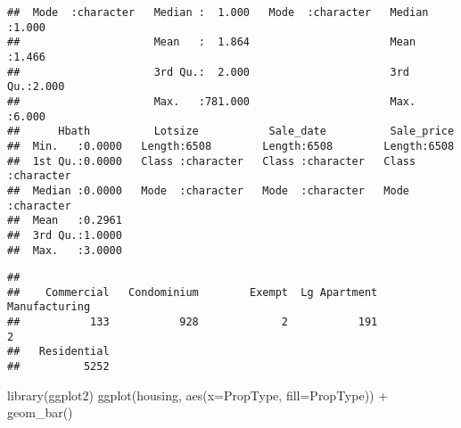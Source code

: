 \documentclass[
]{article}
\newenvironment{Shaded}{\begin{snugshade}}{\end{snugshade}}
\newcommand{\AttributeTok}[1]{\textcolor[rgb]{0.77,0.63,0.00}{#1}}
\newcommand{\CommentTok}[1]{\textcolor[rgb]{0.56,0.35,0.01}{\textit{#1}}}
\newcommand{\ConstantTok}[1]{\textcolor[rgb]{0.00,0.00,0.00}{#1}}
\newcommand{\FunctionTok}[1]{\textcolor[rgb]{0.00,0.00,0.00}{#1}}
\newcommand{\NormalTok}[1]{#1}
\newcommand{\OtherTok}[1]{\textcolor[rgb]{0.56,0.35,0.01}{#1}}
\newcommand{\SpecialCharTok}[1]{\textcolor[rgb]{0.00,0.00,0.00}{#1}}
\begin{document}
\begin{verbatim}
##  Mode  :character   Median :  1.000   Mode  :character   Median :1.000  
##                     Mean   :  1.864                      Mean   :1.466  
##                     3rd Qu.:  2.000                      3rd Qu.:2.000  
##                     Max.   :781.000                      Max.   :6.000  
##      Hbath          Lotsize           Sale_date          Sale_price       
##  Min.   :0.0000   Length:6508        Length:6508        Length:6508       
##  1st Qu.:0.0000   Class :character   Class :character   Class :character  
##  Median :0.0000   Mode  :character   Mode  :character   Mode  :character  
##  Mean   :0.2961                                                           
##  3rd Qu.:1.0000                                                           
##  Max.   :3.0000
\end{verbatim}

\begin{Shaded}
\end{Shaded}

\begin{Shaded}
\end{Shaded}

\begin{verbatim}
## 
##    Commercial   Condominium        Exempt  Lg Apartment Manufacturing 
##           133           928             2           191             2 
##   Residential 
##          5252
\end{verbatim}

\begin{Shaded}
\begin{Highlighting}[]
\FunctionTok{library}\NormalTok{(ggplot2)}
\FunctionTok{ggplot}\NormalTok{(housing, }\FunctionTok{aes}\NormalTok{(}\AttributeTok{x=}\NormalTok{PropType, }\AttributeTok{fill=}\NormalTok{PropType)) }\SpecialCharTok{+} \FunctionTok{geom\_bar}\NormalTok{()}
\end{Highlighting}
\end{Shaded}
\end{document}
